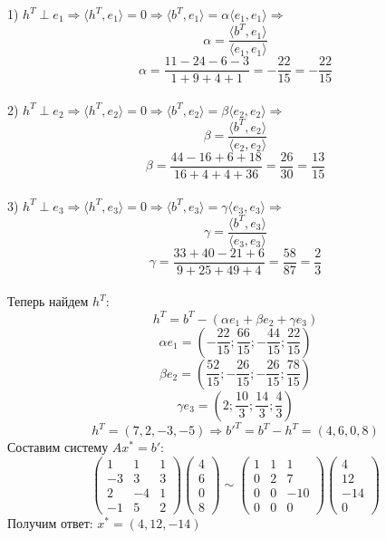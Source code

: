 \documentclass{article}
\begin{document}
1) $h^T \perp e_1 \Rightarrow \langle h^T, e_1 \rangle = 0 \Rightarrow \langle b^T, e_1 \rangle = 
\alpha \langle e_1, e_1 \rangle \Rightarrow $
\[\alpha = \frac{\langle b^T, e_1 \rangle}{\langle e_1, e_1 \rangle}\]
$$\alpha = \frac{11 - 24 - 6 - 3}{1 + 9 + 4 + 1} = -\frac{22}{15} = -\frac{22}{15}$$ \\
2) $h^T \perp e_2 \Rightarrow \langle h^T, e_2 \rangle = 0 \Rightarrow \langle b^T, e_2 \rangle = 
\beta \langle e_2, e_2 \rangle \Rightarrow $
\[ \beta = \frac{\langle b^T, e_2 \rangle}{\langle e_2, e_2 \rangle}\]
$$\beta = \frac{44 - 16 + 6 + 18}{16 + 4 + 4 + 36} = \frac{26}{30} = \frac{13}{15}$$ \\
3) $h^T \perp e_3 \Rightarrow \langle h^T, e_3 \rangle = 0 \Rightarrow \langle b^T, e_3 \rangle = 
\gamma \langle e_3, e_3 \rangle \Rightarrow $
\[ \gamma = \frac{\langle b^T, e_3 \rangle}{\langle e_3, e_3 \rangle}\]
$$\gamma = \frac{33 + 40 - 21 + 6}{9 + 25 + 49 + 4} = \frac{58}{87} = \frac{2}{3}$$ \\
Теперь найдем $h^T$: \\
\[ h^T = b^T - (\alpha e_1 + \beta e_2 + \gamma e_3) \]
\newpage
\[ \alpha e_1 = \left( -\frac{22}{15}; \frac{66}{15}; -\frac{44}{15}; \frac{22}{15}\right) \]
\[ \beta e_2 = \left( \frac{52}{15}; -\frac{26}{15}; -\frac{26}{15}; \frac{78}{15}\right) \]
\[ \gamma e_3 = \left( 2; \frac{10}{3}; \frac{14}{3}; \frac{4}{3} \right) \]
\[ h^T = (7, 2, -3, -5) \Rightarrow b'^T = b^T - h^T = (4, 6, 0, 8) \]
Составим систему $Ax^* = b'$:
\[ \left(\begin{array}{ccc}
    1 & 1 & 1 \\
    -3 & 3 & 3 \\
    2 & -4 & 1 \\
    -1 & 5 & 2
\end{array} \right)
\left( \begin{array}{c}
  4 \\
  6\\
  0 \\
  8
\end{array}\right) \sim
\left(\begin{array}{ccc}
    1 & 1 & 1 \\
    0 & 2 & 7 \\
    0 & 0 & -10 \\
    0 & 0 & 0
\end{array} \right)
\left( \begin{array}{c}
  4 \\
  12\\
  -14 \\
  0
\end{array}\right)
\]
Получим ответ: $x^* = (4, 12, -14)$
\end{document}
